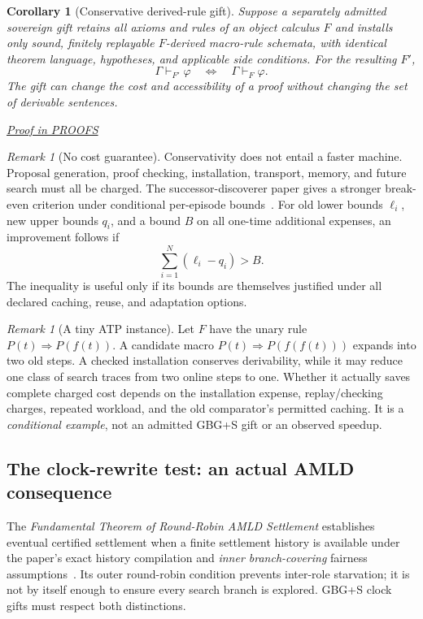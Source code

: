 \documentclass[11pt,letterpaper]{article}
\newtheorem{corollary}[theorem]{Corollary}
\theoremstyle{definition}\newtheorem{definition}[theorem]{Definition}\newtheorem{example}[theorem]{Example}
\theoremstyle{remark}\newtheorem{remark}[theorem]{Remark}
\newcommand{\prooflink}[1]{\par\noindent\hfill\small\hyperref[#1]{\textit{Proof in PROOFS}}\normalsize}
\begin{document}
\begin{corollary}[Conservative derived-rule gift]\label{mvsi:cor:macro}
Suppose a separately admitted sovereign gift retains all axioms and rules of an object calculus $F$ and installs only sound, finitely replayable $F$-derived macro-rule schemata, with identical theorem language, hypotheses, and applicable side conditions. For the resulting $F'$,
\[
\Gamma\vdash_{F'}\varphi\quad\Longleftrightarrow\quad\Gamma\vdash_F\varphi.
\]
The gift can change the cost and accessibility of a proof without changing the set of derivable sentences.
\end{corollary}
\label{br:mvsi:stmt:2}\prooflink{br:mvsi:proof:2}


\begin{remark}[No cost guarantee]
Conservativity does not entail a faster machine. Proposal generation, proof checking, installation, transport, memory, and future search must all be charged. The successor-discoverer paper gives a stronger break-even criterion under conditional per-episode bounds~\cite{mvsi:Successor}. For old lower bounds $\ell_i$, new upper bounds $q_i$, and a bound $B$ on all one-time additional expenses, an improvement follows if
\[
\sum_{i=1}^{N}(\ell_i-q_i)>B.
\]
The inequality is useful only if its bounds are themselves justified under all declared caching, reuse, and adaptation options.
\end{remark}

\begin{remark}[A tiny ATP instance]
Let $F$ have the unary rule $P(t)\Rightarrow P(f(t))$. A candidate macro $P(t)\Rightarrow P(f(f(t)))$ expands into two old steps. A checked installation conserves derivability, while it may reduce one class of search traces from two online steps to one. Whether it actually saves complete charged cost depends on the installation expense, replay/checking charges, repeated workload, and the old comparator's permitted caching. It is a \emph{conditional example}, not an admitted GBG+S gift or an observed speedup.
\end{remark}

\subsection{The clock-rewrite test: an actual AMLD consequence}
The \emph{Fundamental Theorem of Round-Robin AMLD Settlement} establishes eventual certified settlement when a finite settlement history is available under the paper's exact history compilation and \emph{inner branch-covering} fairness assumptions~\cite{mvsi:RoundRobin}. Its outer round-robin condition prevents inter-role starvation; it is not by itself enough to ensure every search branch is explored. GBG+S clock gifts must respect both distinctions.
\end{document}
